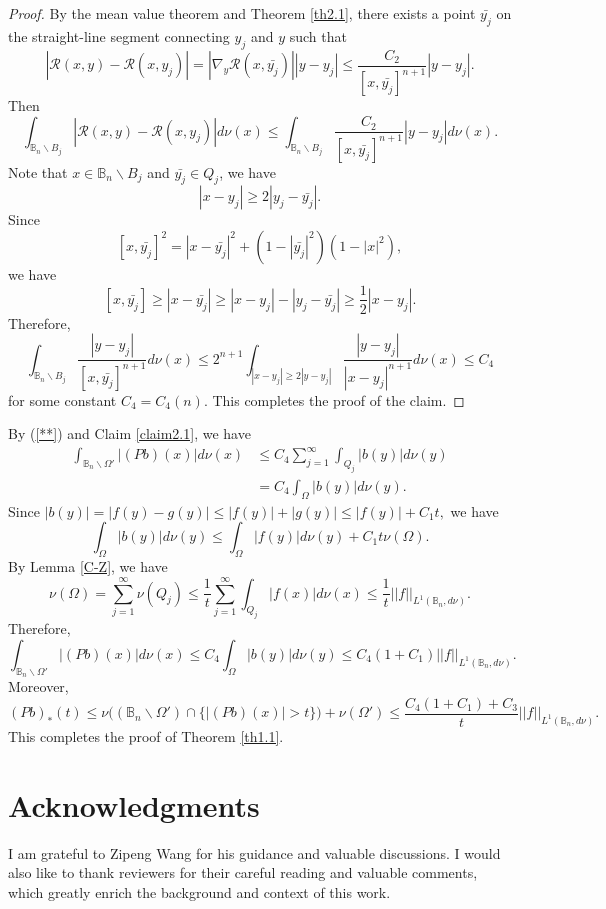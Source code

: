 \documentclass[12pt]{amsart}
\theoremstyle{definition}
\theoremstyle{remark}
\newcommand{\B}{\mathbb{B}}
\begin{document}
\begin{proof}
By the mean value theorem and Theorem \ref{th2.1}, there exists a point $\bar{y_j}$ on the straight-line segment connecting $y_j$ and $y$ such that
\[|\mathcal{R} (x,y)-\mathcal{R} (x,y_j)|=|\nabla_y\mathcal{R} (x,\bar{y_j})| |y-y_j|\leqslant\frac{C_2}{[x,\bar{y_j}]^{n+1}}|y-y_j|.\]
Then 
\[
	\int_{\B_n\backslash B_j}|\mathcal{R} (x,y)-\mathcal{R} (x,y_j)|d\nu (x)\leqslant\int_{\B_n\backslash B_j}\frac{C_2}{[x,\bar{y_j}]^{n+1}}|y-y_j|d\nu(x).
\]
Note that $x\in\B_n\backslash B_j$ and $\bar{y_j}\in Q_j$, we have
\[|x-y_j|\geqslant 2|y_j-\bar{y_j}|.\]
Since 
\[
	[x,\bar{y_j}]^2=|x-\bar{y_j}|^2+(1-|\bar{y_j}|^2)(1-|x|^2),
\]
we have 
\[[x,\bar{y_j}]\geqslant |x-\bar{y_j}|\geqslant|x-y_j|-|y_j-\bar{y_j}|\geqslant\frac{1}{2}|x-y_j|.\]
Therefore, 
\[\int_{\B_n\backslash B_j}\frac{|y-y_j|}{[x,\bar{y_j}]^{n+1}}d\nu(x)\leqslant 2^{n+1}\int_{|x-y_j|\geqslant 2|y-y_j|}\frac{|y-y_j|}{|x-y_j|^{n+1}}d\nu(x)\leqslant C_4\]
for some constant $C_4=C_4(n)$.
This completes the proof of the claim.
\end{proof}

By (\ref{**}) and Claim \ref{claim2.1}, we have
\begin{equation}
	\begin{aligned}
		\int_{\B_n\backslash\Omega'}|(P  b)(x)|d\nu (x)&\leqslant C_4\sum\limits_{j=1}^\infty\int_{Q_j}|b(y)|d\nu (y)\\
		&=C_4\int_{\Omega}|b(y)|d\nu (y).
	\end{aligned}
\end{equation}
Since $|b(y)|=|f(y)-g(y)|\leqslant|f(y)|+|g(y)|\leqslant|f(y)|+C_1t,$ we have
\[\int_{\Omega}|b(y)|d\nu (y)\leqslant\int_{\Omega}|f(y)|d\nu (y)+C_1t\nu (\Omega).\]
By Lemma \ref{C-Z}, we have
\[\nu (\Omega)=\sum\limits_{j=1}^\infty\nu (Q_j)\leqslant\frac{1}{t}\sum\limits_{j=1}^\infty\int_{Q_j}|f(x)|d\nu (x)\leqslant\frac{1}{t}||f||_{L^1(\B_n,d\nu)}.\]
Therefore,
\[\int_{\B_n\backslash\Omega'}|(P  b)(x)|d\nu (x)\leqslant C_4\int_{\Omega}|b(y)|d\nu (y)\leqslant C_4(1+C_1)||f||_{L^1(\B_n,d\nu)}.\]
Moreover,
\[(P  b)_*(t)\leqslant \nu \big((\B_n\backslash\Omega')\cap\{|(P  b)(x)|>t\}\big)+\nu (\Omega')\leqslant\frac{C_4(1+C_1)+C_3}{t}||f||_{L^1(\B_n,d\nu)}.\]
This completes the proof of Theorem \ref{th1.1}.

\section{Acknowledgments}
I am grateful to Zipeng Wang for his guidance and valuable discussions. 
I would also like to thank reviewers for their careful reading and valuable comments, which greatly enrich the background and context of this work.
\end{document}
